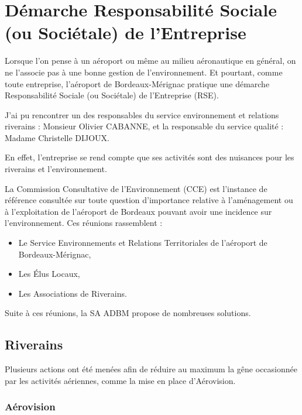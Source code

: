 \newpage

\section{Démarche Responsabilité Sociale (ou Sociétale) de l’Entreprise}


Lorsque l'on pense à un aéroport ou même au milieu aéronautique en général, on ne l'associe pas à une bonne gestion de l'environnement.
Et pourtant, comme toute entreprise, l'aéroport de Bordeaux-Mérignac pratique une démarche Responsabilité Sociale (ou Sociétale) de l'Entreprise (RSE).

J'ai pu rencontrer un des responsables du service environnement et relations riverains : Monsieur Olivier CABANNE, et la responsable du service qualité : Madame Christelle DIJOUX.\newline

En effet, l'entreprise se rend compte que ses activités sont des nuisances pour les riverains et l'environnement. 

La Commission Consultative de l’Environnement (CCE) est l’instance de référence consultée sur toute question d’importance relative à l’aménagement ou à l’exploitation de l’aéroport de Bordeaux pouvant avoir une incidence sur l’environnement. Ces réunions rassemblent : 

\begin{itemize}
  \item Le Service Environnements et Relations Territoriales de l'aéroport de Bordeaux-Mérignac,
  \item Les Élus Locaux,
  \item Les Associations de Riverains.
\end{itemize}

Suite à ces réunions, la SA ADBM propose de nombreuses solutions.\newline

\subsection{Riverains}

Plusieurs actions ont été menées afin de réduire au maximum la gêne occasionnée par les activités aériennes, comme la mise en place d'Aérovision.


\subsubsection{Aérovision}

